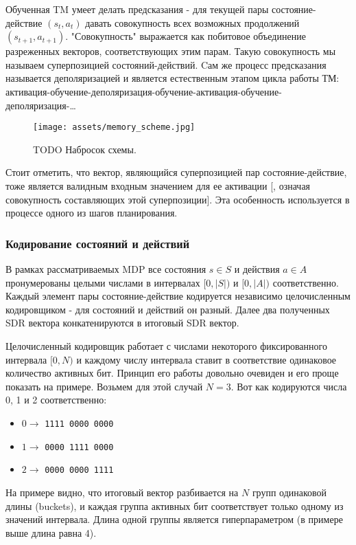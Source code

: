 \documentclass[a4paper]{article}
\begin{document}
Обученная TM умеет делать предсказания - для текущей пары состояние-действие $(s_t, a_t)$ давать совокупность всех возможных продолжений $(s_{t+1}, a_{t+1})$. "Совокупность" выражается как побитовое объединение разреженных векторов, соответствующих этим парам. Такую совокупность мы называем суперпозицией состояний-действий. Cам же процесс предсказания называется деполяризацией и является естественным этапом цикла работы ТМ: активация-обучение-деполяризация-обучение-активация-обучение-деполяризация-\dots

\begin{figure}
  \texttt{[image: assets/memory\_scheme.jpg]}
  \caption{TODO Набросок схемы.}
\end{figure}

Стоит отметить, что вектор, являющийся суперпозицией пар состояние-действие, тоже является валидным входным значением для ее активации [, означая совокупность составляющих этой суперпозиции]. Эта особенность используется в процессе одного из шагов планирования.

\subsubsection{Кодирование состояний и действий}

В рамках рассматриваемых MDP все состояния $s \in S$ и действия $a \in A$ пронумерованы целыми числами в интервалах $[0, |S|)$ и $[0, |A|)$ соответственно. Каждый элемент пары состояние-действие кодируется независимо целочисленным кодировщиком - для состояний и действий он разный. Далее два полученных SDR вектора конкатенируются в итоговый SDR вектор.

Целочисленный кодировщик работает с числами некоторого фиксированного интервала $[0, N)$ и каждому числу интервала ставит в соответствие одинаковое количество активных бит. Принцип его работы довольно очевиден и его проще показать на примере. Возьмем для этой случай $N = 3$. Вот как кодируются числа 0, 1 и 2 соответственно:

\begin{itemize}
  \item $0 \rightarrow$ \verb|1111 0000 0000|
  \item $1 \rightarrow$ \verb|0000 1111 0000|
  \item $2 \rightarrow$ \verb|0000 0000 1111|
\end{itemize}

На примере видно, что итоговый вектор разбивается на $N$ групп одинаковой длины (buckets), и каждая группа активных бит соответствует только одному из значений интервала. Длина одной группы является гиперпараметром (в примере выше длина равна 4).
\end{document}
